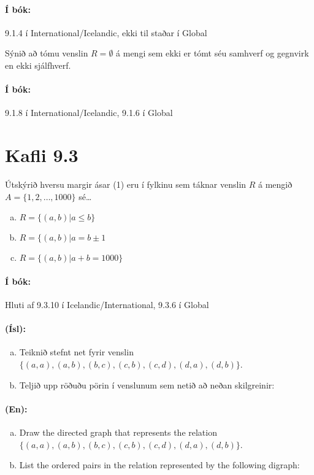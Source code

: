 \documentclass{article}
\begin{document}
\paragraph{Í bók:} 9.1.4 í International/Icelandic, ekki til staðar í Global

\question Sýnið að tómu venslin $R=\emptyset$ á mengi sem ekki er tómt séu samhverf og gegnvirk en ekki sjálfhverf.

\paragraph{Í bók:} 9.1.8 í International/Icelandic, 9.1.6 í Global

\section{Kafli 9.3}

\question Útskýrið hversu margir ásar (1) eru í fylkinu sem táknar venslin $R$ á mengið $A=\{1,2,\ldots,1000\}$ sé\ldots

\begin{enumerate}[a)]
    \item $R= \{(a,b)| a \leq b\}$
    \item $R= \{(a,b)| a = b\pm 1$
    \item $R= \{(a,b)| a+b=1000\}$
\end{enumerate}

\paragraph{Í bók:} Hluti af 9.3.10 í Icelandic/International, 9.3.6 í Global

\question

\paragraph{(Ísl):}
\begin{enumerate}[a)]
    \item Teiknið stefnt net fyrir venslin $\{(a, a), (a, b), (b, c), (c, b), (c, d), (d, a), (d, b)\}$.
    \item Teljið upp röðuðu pörin í venslunum sem netið að neðan skilgreinir:
\end{enumerate}

\paragraph{(En):}
\begin{enumerate}[a)]
    \item  Draw the directed graph that represents the relation
    $\{(a, a), (a, b), (b, c), (c, b), (c, d), (d, a), (d, b)\}$.
    \item List the ordered pairs in the relation represented by the following digraph:
\end{enumerate}
\end{document}
